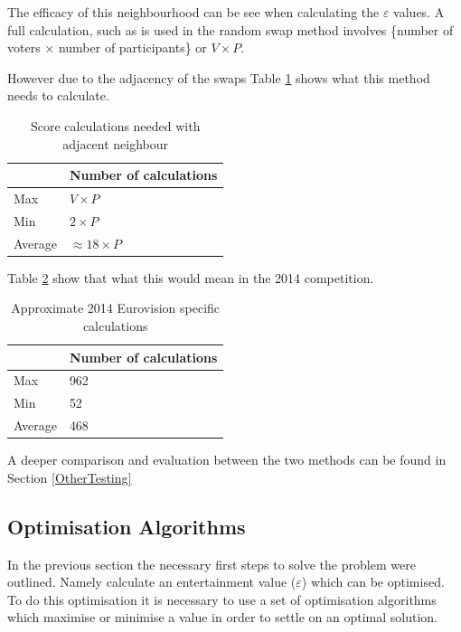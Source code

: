 \documentclass[12pt]{report}
\begin{document}
The efficacy of this neighbourhood can be see when calculating the $\varepsilon$ values. A full calculation, such as is used in the random swap method involves \{number of voters $\times$ number of participants\} or $V \times P$. 

However due to the adjacency of the swaps Table \ref{scoreCalcsAdj} shows what this method needs to calculate.

\begin{table}[H]
\centering
\caption{Score calculations needed with adjacent neighbour}
\label{scoreCalcsAdj}
\begin{tabular}{|l|l|}
\hline
        & Number of calculations \\ \hline
Max     & $V \times P$           \\ \hline
Min     & $2 \times P$           \\ \hline
Average & $\approx 18 \times P$          \\ \hline
\end{tabular}
\end{table}

Table \ref{scoreCalcsAdj2014} show that what this would mean in the 2014 competition.
\begin{table}[H]
\centering
\caption{Approximate 2014 Eurovision specific calculations}
\label{scoreCalcsAdj2014}
\begin{tabular}{|l|l|}
\hline
        & Number of calculations \\ \hline
Max     & 962                    \\ \hline
Min     & 52                     \\ \hline
Average & 468                    \\ \hline
\end{tabular}
\end{table}

A deeper comparison and evaluation between the two methods can be found in Section \ref{OtherTesting}

\subsection{Optimisation Algorithms}\label{Algorithms}
In the previous section the necessary first steps to solve the problem were outlined. Namely calculate an entertainment value ($\varepsilon$) which can be optimised. To do this optimisation it is necessary to use a set of optimisation algorithms which maximise or minimise a value in order to settle on an optimal solution.
\end{document}
